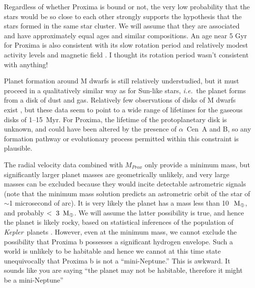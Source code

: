 \documentclass[preprint,12pt]{aastex}
\newcommand{\xxx}[1]{{\color{red} #1}} %
\def\mearth{{\rm\,M_\oplus}}
\def\eg{{\it e.g.\ }}
\def\ie{{\it i.e.\ }}
\def\acen{{$\alpha$~Cen}}
\def\kepler{{\it Kepler}}
\begin{document}
Regardless of whether Proxima is bound or not, the very low
probability that the stars would be so close to each other strongly
supports the hypothesis that the stars formed in the same star
cluster. We will assume that they are associated and have
approximately equal ages and similar compositions. An age near 5 Gyr
for Proxima is also consistent with its slow rotation period and relatively
modest activity levels and magnetic field \citep{ReinersBasri08}. 
\xxx{I thought its rotation period wasn't consistent with anything!}

Planet formation around M dwarfs is still relatively understudied, but
it must proceed in a qualitatively similar way as for Sun-like stars,
\ie the planet forms from a disk of dust and gas. Relatively few
observations of disks of M dwarfs exist
\citep[\eg][]{Hernandez07,WilliamsCieza11,Luhman12,Downes15}, but
these data seem to point to a wide range of lifetimes for the gaseous
disks of 1--15~Myr. For Proxima, the lifetime of the protoplanetary
disk is unknown, and could have been altered by the presence of
\acen~A and B, so any formation pathway or evolutionary process
permitted within this constraint is plausible.

The radial velocity data combined with $M_{Prox}$ only provide a
minimum mass, but significantly larger planet masses are geometrically
unlikely, and very large masses can be excluded because they
would incite detectable astrometric signals (note that the minimum
mass solution predicts an astrometric orbit of the star of $\sim$1
microsecond of arc). It is very likely the planet has a mass less than
10~$\mearth$, and probably $<~3~\mearth$. We will assume the latter
possibility is true, and hence the planet is likely rocky, based on
statistical inferences of the population of \kepler~planets
\citep{WeissMarcy14,Rogers15}. However, even at the minimum mass, we
cannot exclude the possibility that Proxima b possesses a significant
hydrogen envelope. Such a world is unlikely to be habitable \citep[but
  see][]{PierrehumbertGaidos11} and hence we cannot at this time state
unequivocally that Proxima b is not a ``mini-Neptune.'' \xxx{This is awkward.
It sounds like you are saying ``the planet may not be habitable, therefore
it might be a mini-Neptune''}
\end{document}
